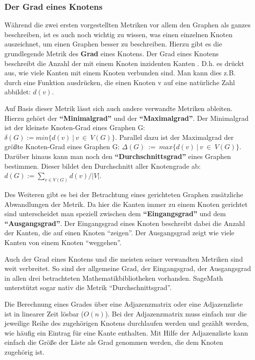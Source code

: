 \documentclass[a4paper,12pt,ngerman,chapterprefix=false,listof=totoc,bibliography=totoc]{scrreprt}
\begin{document}
\subsubsection*{Der Grad eines Knotens}
{
Während die zwei ersten vorgestellten Metriken vor allem den Graphen als ganzes beschreiben, ist es auch noch wichtig zu wissen, was einen einzelnen Knoten auszeichnet, um einen Graphen besser zu beschreiben. Hierzu gibt es die grundlegende Metrik des \textbf{Grad} eines Knotens. Der Grad eines Knotens beschreibt die Anzahl der mit einem Knoten inzidenten Kanten \cite{diestel_graphentheorie_2000}. D.h. es drückt aus, wie viele Kanten mit einem Knoten verbunden sind. Man kann dies z.B. durch eine Funktion ausdrücken, die einen Knoten v auf eine natürliche Zahl abbildet: \(d(v)\).

Auf Basis dieser Metrik lässt sich auch andere verwandte Metriken ableiten. Hierzu gehört der \textbf{"`Minimalgrad"'} und der \textbf{"`Maximalgrad"'}. Der Minimalgrad ist der kleinste Knoten-Grad eines Graphen G: \(\delta (G):=min\{d(v)\ \vert\ v\ \in\ V(G)\}\). Parallel dazu ist der Maximalgrad der größte Knoten-Grad eines Graphen G: \(\Delta (G)\ :=\ max\{d(v)\ \vert\ v\ \in\ V(G)\}\). Darüber hinaus kann man noch den \textbf{"`Durchschnittsgrad"'} eines Graphen bestimmen. Dieser bildet den Durchschnitt aller Knotengrade ab: \(d(G):=\sum_{v\in V(G)}d(v)/\vert V\vert\). \cite{diestel_graphentheorie_2000}

Des Weiteren gibt es bei der Betrachtung eines gerichteten Graphen zusätzliche Abwandlungen der Metrik. Da hier die Kanten immer zu einem Knoten gerichtet sind unterscheidet man speziell zwischen dem \textbf{"`Eingangsgrad"'} und dem \textbf{"`Ausgangsgrad"'}. Der Eingangsgrad eines Knoten beschreibt dabei die Anzahl der Kanten, die auf einen Knoten "`zeigen"'. Der Ausgangsgrad zeigt wie viele Kanten von einem Knoten "`weggehen"'. \cite{balakrishnan_schaums_1997}

Auch der Grad eines Knotens und die meisten seiner verwandten Metriken sind weit verbreitet. So sind der allgemeine Grad, der Eingangsgrad, der Ausgangsgrad in allen drei betrachteten Mathematikbibliotheken vorhanden. SageMath unterstützt sogar nativ die Metrik "`Durchschnittsgrad"'. \cite{sagemath_graph_2020,matlab_directed_2020,wolfram_graph_2020}

Die Berechnung eines Grades über eine Adjazenzmatrix oder eine Adjazenzliste ist in linearer Zeit lösbar (\(O(n)\)). Bei der Adjazenzmatrix muss einfach nur die jeweilige Reihe des zugehörigen Knotens durchlaufen werden und gezählt werden, wie häufig ein Eintrag für eine Kante enthalten. Mit Hilfe der Adjazenzliste kann einfach die Größe der Liste als Grad genommen werden, die dem Knoten zugehörig ist.
}
\end{document}
